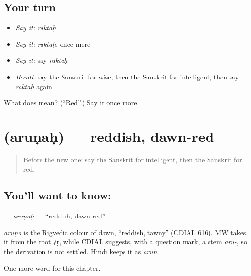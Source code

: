 \subsection*{Your turn}
\begin{itemize}
\raggedright
  \item \emph{Say it:} \emph{raktaḥ}
  \item \emph{Say it:} \emph{raktaḥ}, once more
  \item \emph{Say it:} say \emph{raktaḥ}
  \item \emph{Recall:} say the Sanskrit for wise, then the Sanskrit for intelligent, then say \emph{raktaḥ} again
\end{itemize}

\begin{tcolorbox}[breakable,colback=teal!4,colframe=teal!35!black,title={Before you move on}]
What does  mean? (\textquotedblleft{}Red\textquotedblright{}.) Say it once more.
\end{tcolorbox}
\section[\texorpdfstring{\sk{अरुणः} (aruṇaḥ)}{अरुणः (aruṇaḥ)}]{ (aruṇaḥ) — reddish, dawn-red}

\label{lesson:SA-C217-arunah}



\begin{quote}
Before the new one: say the Sanskrit for intelligent, then the Sanskrit for red.
\end{quote}

\subsection*{You'll want to know: }
\textbf{} — \emph{aruṇaḥ} — \textquotedblleft{}reddish, dawn-red\textquotedblright{}.

\begin{cousinweb}
\emph{aruṇa} is the Rigvedic colour of dawn, \textquotedblleft{}reddish, tawny\textquotedblright{} (CDIAL 616). MW takes it from the root √ṛ, while CDIAL suggests, with a question mark, a stem \emph{aru-}, so the derivation is not settled. Hindi keeps it as \emph{arun}.
\end{cousinweb}

\begin{grammarlens}[title={What you've built}]
One more word for this chapter.
\end{grammarlens}

